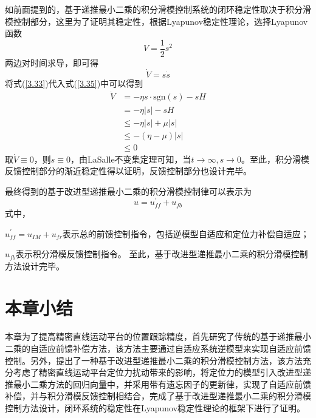 如前面提到的，基于递推最小二乘的积分滑模控制系统的闭环稳定性取决于积分滑模控制部分，这里为了证明其稳定性，根据Lyapunov稳定性理论，选择Lyapunov函数
\begin{equation}
\label{3.34}
V=\frac{1}{2}s^2
\end{equation}
两边对时间求导，即可得
\begin{equation}
\label{3.35}
\dot{V}=s\dot{s}
\end{equation}
将式(\ref{3.33})代入式(\ref{3.35})中可以得到
\begin{equation}
\label{3.36}
\begin{aligned}
\dot{V}&=-\eta s\cdot\text{sgn}(s)-sH\\
&=-\eta\left|s\right|-sH\\
&\leq-\eta\left|s\right|+\mu\left|s\right|\\
&\leq-(\eta-\mu)\left|s\right|\\
&\leq 0
\end{aligned}
\end{equation}
取$\dot{V}\equiv0$，则$s\equiv0$，由LaSalle不变集定理可知，当$t\to\infty,s\to0$。至此，积分滑模反馈控制部分的渐近稳定性得以证明，反馈控制部分也设计完毕。

最终得到的基于改进型递推最小二乘的积分滑模控制律可以表示为
\begin{equation}
\label{改进的控制律}
u=u_{ff}^{'}+u_{fb}
\end{equation}
式中，

$u_{ff}^{'}=u_{IM}+u_{fr}$表示总的前馈控制指令，包括逆模型自适应和定位力补偿自适应；

$u_{fb}$表示积分滑模反馈控制指令。
至此，基于改进型递推最小二乘的积分滑模控制方法设计完毕。
\section{本章小结}
本章为了提高精密直线运动平台的位置跟踪精度，首先研究了传统的基于递推最小二乘的自适应前馈补偿方法，该方法主要通过自适应系统逆模型来实现自适应前馈控制。另外，提出了一种基于改进型递推最小二乘的积分滑模控制方法，该方法充分考虑了精密直线运动平台定位力扰动带来的影响，将定位力的模型引入改进型递推最小二乘方法的回归向量中，并采用带有遗忘因子的更新律，实现了自适应前馈补偿，并与积分滑模反馈控制相结合，完成了基于改进型递推最小二乘的积分滑模控制方法设计，闭环系统的稳定性在Lyapunov稳定性理论的框架下进行了证明。





